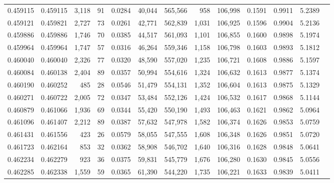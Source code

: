 \begin{tabular}{rrrrrrrrrrrrr}
0.459115 & 0.459115 & 3,118 &    91 &                                     0.0284 &  40,044 & 565,566 &     958 & 106,998 & 0.1591 & 0.9911 & 5.2389 \\
0.459121 & 0.459821 & 2,727 &    73 &                                     0.0261 &  42,771 & 562,839 &   1,031 & 106,925 & 0.1596 & 0.9904 & 5.2136 \\
0.459886 & 0.459886 & 1,746 &    70 &                                     0.0385 &  44,517 & 561,093 &   1,101 & 106,855 & 0.1600 & 0.9898 & 5.1974 \\
0.459964 & 0.459964 & 1,747 &    57 &                                     0.0316 &  46,264 & 559,346 &   1,158 & 106,798 & 0.1603 & 0.9893 & 5.1812 \\
0.460040 & 0.460040 & 2,326 &    77 &                                     0.0320 &  48,590 & 557,020 &   1,235 & 106,721 & 0.1608 & 0.9886 & 5.1597 \\
0.460084 & 0.460138 & 2,404 &    89 &                                     0.0357 &  50,994 & 554,616 &   1,324 & 106,632 & 0.1613 & 0.9877 & 5.1374 \\
0.460190 & 0.460252 &   485 &    28 &                                     0.0546 &  51,479 & 554,131 &   1,352 & 106,604 & 0.1613 & 0.9875 & 5.1329 \\
0.460271 & 0.460722 & 2,005 &    72 &                                     0.0347 &  53,484 & 552,126 &   1,424 & 106,532 & 0.1617 & 0.9868 & 5.1144 \\
0.460879 & 0.461066 & 1,936 &    69 &                                     0.0344 &  55,420 & 550,190 &   1,493 & 106,463 & 0.1621 & 0.9862 & 5.0964 \\
0.461096 & 0.461407 & 2,212 &    89 &                                     0.0387 &  57,632 & 547,978 &   1,582 & 106,374 & 0.1626 & 0.9853 & 5.0759 \\
0.461431 & 0.461556 &   423 &    26 &                                     0.0579 &  58,055 & 547,555 &   1,608 & 106,348 & 0.1626 & 0.9851 & 5.0720 \\
0.461723 & 0.462164 &   853 &    32 &                                     0.0362 &  58,908 & 546,702 &   1,640 & 106,316 & 0.1628 & 0.9848 & 5.0641 \\
0.462234 & 0.462279 &   923 &    36 &                                     0.0375 &  59,831 & 545,779 &   1,676 & 106,280 & 0.1630 & 0.9845 & 5.0556 \\
0.462285 & 0.462338 & 1,559 &    59 &                                     0.0365 &  61,390 & 544,220 &   1,735 & 106,221 & 0.1633 & 0.9839 & 5.0411 \\

\end{tabular}
